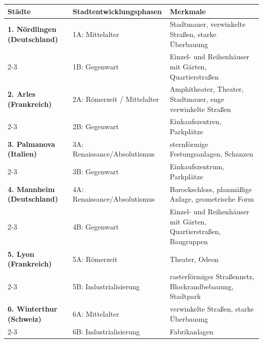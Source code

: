 \begin{myexercise}
\begin{myanswer}
\begin{table}[H]
\centering
\begin{tabular}{p{4cm}|p{4cm}|p{6cm}}
\textbf{Städte} & \textbf{Stadtentwicklungsphasen} & \textbf{Merkmale} \\ \midrule\midrule
\textbf{1. Nördlingen (Deutschland)} & 1A: Mittelalter & Stadtmauer, verwinkelte Straßen, starke Überbauung \\ \cline{2-3}
& 1B: Gegenwart & Einzel- und Reihenhäuser mit Gärten, Quartierstraßen \\ \midrule
\textbf{2. Arles (Frankreich)} & 2A: Römerzeit / Mittelalter & Amphitheater, Theater, Stadtmauer, enge verwinkelte Straßen \\ \cline{2-3}
& 2B: Gegenwart & Einkaufszentren, Parkplätze \\ \midrule
\textbf{3. Palmanova (Italien)} & 3A: Renaissance/Absolutismus & sternförmige Festungsanlagen, Schanzen \\ \cline{2-3}
& 3B: Gegenwart & Einkaufszentrum, Parkplätze \\ \midrule
\textbf{4. Mannheim (Deutschland)} & 4A: Renaissance/Absolutismus & Barockschloss, planmäßige Anlage, geometrische Form \\ \cline{2-3}
& 4B: Gegenwart & Einzel- und Reihenhäuser mit Gärten, Quartierstraßen, Baugruppen \\ \midrule
\textbf{5. Lyon (Frankreich)} & 5A: Römerzeit & Theater, Odeon \\ \cline{2-3}
& 5B: Industrialisierung & rasterförmiges Straßennetz, Blockrandbebauung, Stadtpark \\ \midrule
\textbf{6. Winterthur (Schweiz)} & 6A: Mittelalter & verwinkelte Straßen, starke Überbauung \\ \cline{2-3}
& 6B: Industrialisierung & Fabrikanlagen \\
\end{tabular}
\end{table}
\end{myanswer}

\end{myexercise}